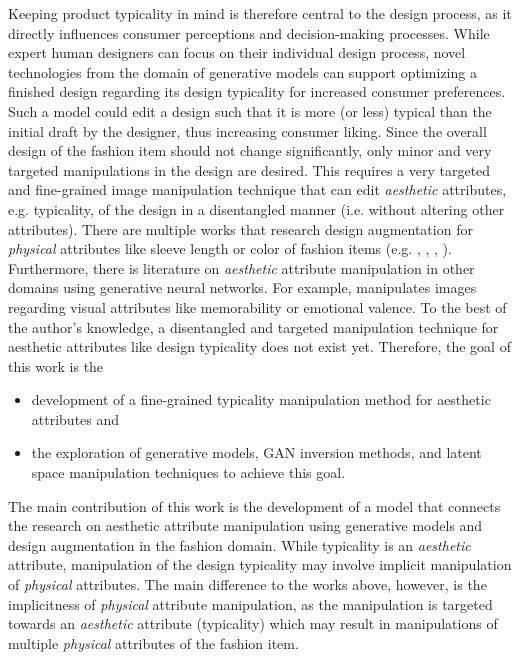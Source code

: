 Keeping product typicality in mind is therefore central to the design process, as it directly influences consumer perceptions and decision-making processes. While expert human designers can focus on their individual design process, novel technologies from the domain of generative models can support optimizing a finished design regarding its design typicality for increased consumer preferences. Such a model could edit a design such that it is more (or less) typical than the initial draft by the designer, thus increasing consumer liking. Since the overall design of the fashion item should not change significantly, only minor and very targeted manipulations in the design are desired. This requires a very targeted and fine-grained image manipulation technique that can edit \textit{aesthetic} attributes, e.g. typicality, of the design in a disentangled manner (i.e. without altering other attributes). There are multiple works that research design augmentation for \textit{physical} attributes like sleeve length or color of fashion items (e.g. \cite{choi2023developing}, \cite{chen2020tailorgan}, \cite{ping2019fashion}, \cite{kwon2022tailor}). Furthermore, there is literature on \textit{aesthetic} attribute manipulation in other domains using generative neural networks. For example, \cite{goetschalckx2019ganalyze} manipulates images regarding visual attributes like memorability or emotional valence. To the best of the author's knowledge, a disentangled and targeted manipulation technique for aesthetic attributes like design typicality does not exist yet. Therefore, the goal of this work is the 
\begin{itemize}
    \item development of a fine-grained typicality manipulation method for aesthetic attributes and
    \item the exploration of generative models, GAN inversion methods, and latent space manipulation techniques to achieve this goal.
\end{itemize} 
The main contribution of this work is the development of a model that connects the research on aesthetic attribute manipulation using generative models and design augmentation in the fashion domain. While typicality is an \textit{aesthetic} attribute, manipulation of the design typicality may involve implicit manipulation of \textit{physical} attributes. The main difference to the works above, however, is the implicitness of \textit{physical} attribute manipulation, as the manipulation is targeted towards an \textit{aesthetic} attribute (typicality) which may result in manipulations of multiple \textit{physical} attributes of the fashion item.\\
